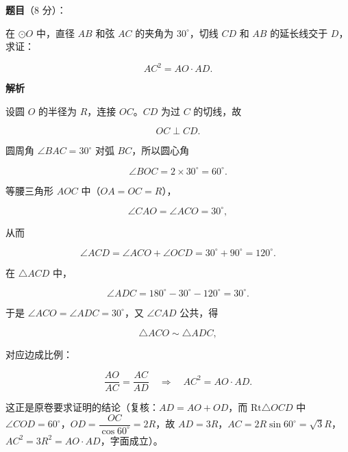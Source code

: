 \begin{answer}

\textbf{题目}（8 分）：

在 $\odot O$ 中，直径 $AB$ 和弦 $AC$ 的夹角为 $30^\circ$，切线 $CD$ 和 $AB$ 的延长线交于 $D$，求证：

\nopagebreak[4]
\[
AC^2=AO\cdot AD.
\]
\nopagebreak[4]
\begin{center}\end{center}
\nopagebreak[4]
\textbf{解析}
\nopagebreak[4]
\begin{center}\end{center}
\nopagebreak[4]
设圆 $O$ 的半径为 $R$，连接 $OC$。$CD$ 为过 $C$ 的切线，故

\nopagebreak[4]
\[
OC\perp CD.
\]

圆周角 $\angle BAC=30^\circ$ 对弧 $BC$，所以圆心角

\nopagebreak[4]
\[
\angle BOC=2\times 30^\circ=60^\circ.
\]

等腰三角形 $AOC$ 中（$OA=OC=R$），

\nopagebreak[4]
\[
\angle CAO=\angle ACO=30^\circ,
\]

从而

\nopagebreak[4]
\[
\angle ACD=\angle ACO+\angle OCD=30^\circ+90^\circ=120^\circ.
\]

在 $\triangle ACD$ 中，

\nopagebreak[4]
\[
\angle ADC=180^\circ-30^\circ-120^\circ=30^\circ.
\]

于是 $\angle ACO=\angle ADC=30^\circ$，又 $\angle CAD$ 公共，得

\nopagebreak[4]
\[
\triangle ACO\sim\triangle ADC,
\]

对应边成比例：

\nopagebreak[4]
\[
\frac{AO}{AC}=\frac{AC}{AD}
\quad\Longrightarrow\quad
AC^2=AO\cdot AD.
\]

这正是原卷要求证明的结论（复核：$AD=AO+OD$，而 $\mathrm{Rt}\triangle OCD$ 中 $\angle COD=60^\circ$，$OD=\dfrac{OC}{\cos 60^\circ}=2R$，故 $AD=3R$，$AC=2R\sin 60^\circ=\sqrt3 R$，$AC^2=3R^2=AO\cdot AD$，字面成立）。


\end{answer}
